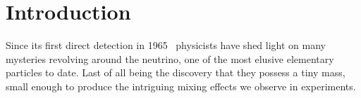 
\chapter{Introduction}%
\label{chap:introduction}

Since its first direct detection in 1965~\cite{Cowan1956} physicists
have shed light on many mysteries revolving around the neutrino, one
of the most elusive elementary particles to date. Last of all being
the discovery that they possess a tiny mass, small enough to produce
the intriguing mixing effects we observe in experiments.
